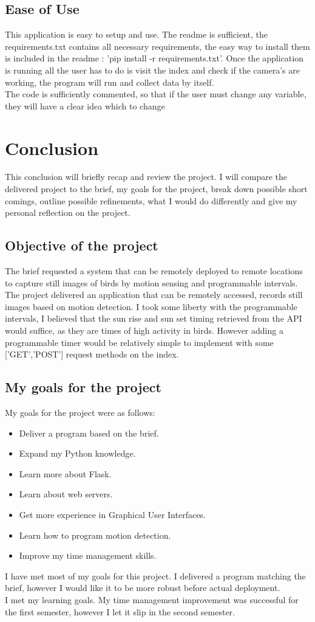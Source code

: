 \section {Ease of Use}
This application is easy to setup and use. The readme is sufficient, the requirements.txt contains all necessary requirements, the easy way to install them is included in the readme : 'pip install -r requirements.txt'. Once the application is running all the user has to do is visit the index and check if the camera's are working, the program will run and collect data by itself. \\ The code is sufficiently commented, so that if the user must change any variable, they will have a clear idea which to change

\chapter{Conclusion}
This conclusion will briefly recap and review the project. I will compare the delivered project to the brief, my goals for the project, break down possible short comings, outline possible refinements, what I would do differently and give my personal reflection on the project.
\section{Objective of the project}
The brief requested a system that can be remotely deployed to remote locations to capture still images of birds by motion sensing and programmable intervals. The project delivered an application that can be remotely accessed, records still images based on motion detection. I took some liberty with the programmable intervals, I believed that the sun rise and sun set timing retrieved from the API would suffice, as they are times of high activity in birds. However adding a programmable timer would be relatively simple to implement with some ['GET','POST'] request methods on the index.
\section{My goals for the project}
My goals for the project were as follows:
\begin{itemize}
    \item Deliver a program based on the brief.
    \item Expand my Python knowledge.
    \item Learn more about Flask.
    \item Learn about web servers.
    \item Get more experience in Graphical User Interfaces.
    \item Learn how to program motion detection.
    \item Improve my time management skills.
\end{itemize}
I have met most of my goals for this project. I delivered a program matching the brief, however I would like it to be more robust before actual deployment. \\ I met my learning goals. My time management improvement was successful for the first semester, however I let it slip in the second semester.

